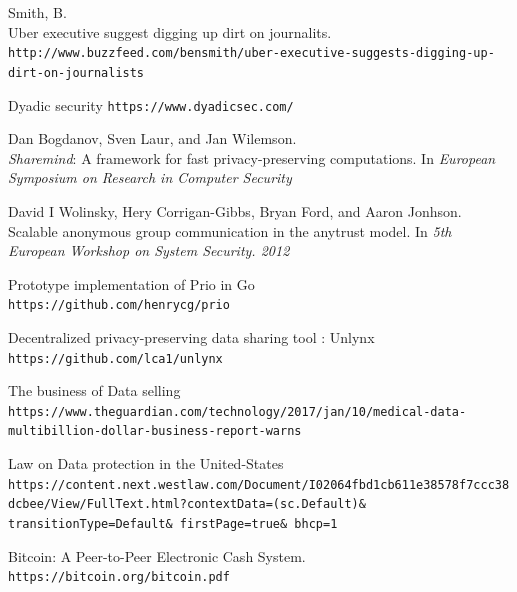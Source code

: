 \documentclass{article}
\begin{document}
\begin{thebibliography}{9}
Smith, B.\\
Uber executive suggest digging up dirt on journalits.
\\\texttt{http://www.buzzfeed.com/bensmith/uber-executive-suggests-digging-up-dirt-on-journalists}

Dyadic security \texttt{https://www.dyadicsec.com/}

Dan Bogdanov, Sven Laur, and Jan Wilemson.\\
\textit{Sharemind}: A framework for fast privacy-preserving computations. In \textit{European Symposium on Research in Computer Security}

David I Wolinsky, Hery Corrigan-Gibbs, Bryan Ford, and Aaron Jonhson.\\
Scalable anonymous group communication in the anytrust model. In \textit{5th European Workshop on System Security. 2012}


Prototype implementation of Prio in Go
\\\texttt{https://github.com/henrycg/prio}

Decentralized privacy-preserving data sharing tool : Unlynx\\
\texttt{https://github.com/lca1/unlynx}

The business of Data selling\\
\texttt{https://www.theguardian.com/technology/2017/jan/10/medical-data-multibillion-dollar-business-report-warns}

Law on Data protection in the United-States\\
\texttt{https://content.next.westlaw.com/Document/I02064fbd1cb611e38578f7ccc38dcbee/View/FullText.html?contextData=(sc.Default)\& transitionType=Default\& firstPage=true\& bhcp=1}


Bitcoin: A Peer-to-Peer Electronic Cash System.\\
\texttt{https://bitcoin.org/bitcoin.pdf}



\end{thebibliography}
\end{document}
